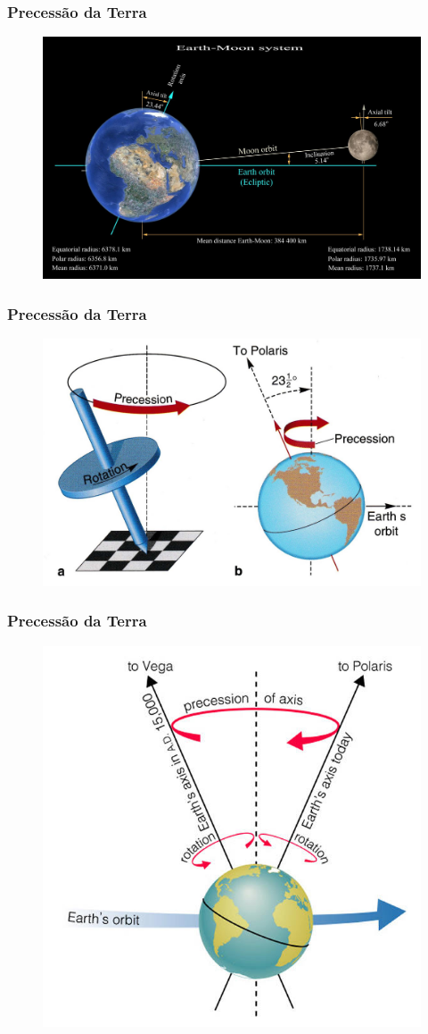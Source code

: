 \documentclass{beamer}
\begin{document}
\begin{frame}
\frametitle{Precessão da Terra}
\begin{figure}
\includegraphics[width=4.0 in]{figuras/earth_moon_system.jpg}
\end{figure}
\end{frame}


\begin{frame}
\frametitle{Precessão da Terra}
\begin{figure}
\includegraphics[width=3.9 in]{figuras/precession1a.jpg}
\end{figure}
\end{frame}

\begin{frame}
\frametitle{Precessão da Terra}
\begin{figure}
\includegraphics[width=2.2 in]{figuras/earthprecess.jpg}
\end{figure}
\end{frame}
\end{document}
